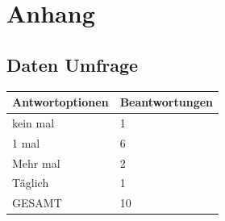\chapter{Anhang}
\section{Daten Umfrage}
\begin{figure}
	\centering
\end{figure}


\begin{tabular}{|l|l|}\hline
	Antwortoptionen	& Beantwortungen \\\hline
	kein mal 		& 1 \\\hline
	1 mal			& 6 \\\hline
	Mehr mal 		& 2 \\\hline
	Täglich 		& 1 \\\hline
	GESAMT			& 10 \\\hline			
\end{tabular}
